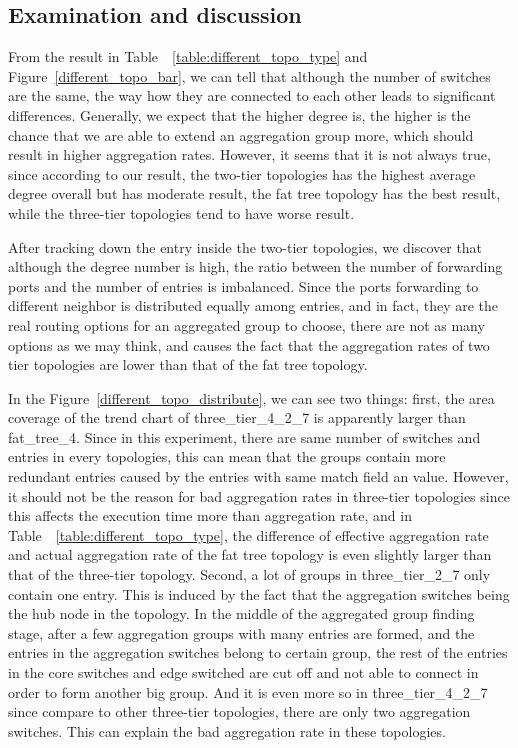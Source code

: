 \subsection{Examination and discussion}
\label{examination_and_discussion}
From the result in Table~~\ref{table:different_topo_type} and Figure~\ref{different_topo_bar}, we can tell that although the number of switches are the same, the way how they are connected to each other leads to significant differences. Generally, we expect that the higher degree is, the higher is the chance that we are able to extend an aggregation group more, which should result in higher aggregation rates. However, it seems that it is not always true, since according to our result, the two-tier topologies has the highest average degree overall but has moderate result, the fat tree topology has the best result, while the three-tier topologies tend to have worse result. 

After tracking down the entry inside the two-tier topologies, we discover that although the degree number is high, the ratio between the number of forwarding ports and the number of entries is imbalanced. Since the ports forwarding to different neighbor is distributed equally among entries, and in fact, they are the real routing options for an aggregated group to choose, there are not as many options as we may think, and causes the fact that the aggregation rates of two tier topologies are lower than that of the fat tree topology. 

In the Figure~\ref{different_topo_distribute}, we can see two things: first, the area coverage of the trend chart of three\_tier\_4\_2\_7 is apparently larger than fat\_tree\_4. Since in this experiment, there are same number of switches and entries in every topologies, this can mean that the groups contain more redundant entries caused by the entries with same match field an value. However, it should not be the reason for bad aggregation rates in three-tier topologies since this affects the execution time more than aggregation rate, and in Table~~\ref{table:different_topo_type}, the difference of effective aggregation rate and actual aggregation rate of the fat tree topology is even slightly larger than that of the three-tier topology. Second, a lot of groups in three\_tier\_2\_7 only contain one entry. This is induced by the fact that the aggregation switches being the hub node in the topology. In the middle of the aggregated group finding stage, after a few aggregation groups with many entries are formed, and the entries in the aggregation switches belong to certain group, the rest of the entries in the core switches and edge switched are cut off and not able to connect in order to form another big group. And it is even more so in three\_tier\_4\_2\_7 since compare to other three-tier topologies, there are only two aggregation switches.
This can explain the bad aggregation rate in these topologies.

